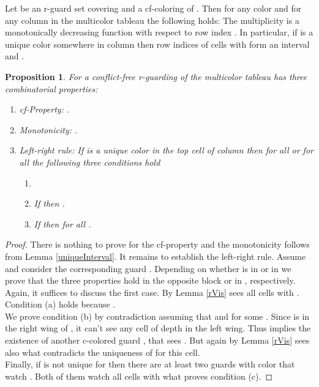 \documentclass[a4paper,USenglish,numberwithinsect]{lipics}
\theoremstyle{plain}
\newtheorem{proposition}[theorem]{Proposition}
\begin{document}
\begin{lemma}
\label{uniqueInterval}
Let  be an r-guard set covering  and  
a cf-coloring of . Then for any color  and for any column in
the multicolor tableau  the following holds: The
multiplicity 
is a monotonically decreasing function with respect to  row index .
In particular, if  is a unique color somewhere in column  then
row indices of cells
with  form an interval  and  .
\end{lemma}

\begin{proposition}
\label{r-visAdmiss}
For  a conflict-free r-guarding   of 
the multicolor
tableau 
has  three combinatorial properties:
\begin{enumerate}
\item cf-Property: .
\item Monotonicity: .
\item Left-right rule:   If  is a unique color in the top cell
 of column  then for
all  or for all  the following three
conditions hold
\begin{enumerate}
\item 
\item If  then  .
\item If  then  for all .
\end{enumerate}
\end{enumerate}
\end{proposition}
\begin{proof}
There is nothing to prove for the cf-property and the monotonicity
follows from
Lemma \ref{uniqueInterval}.
It remains to establish the left-right rule.
Assume   and consider  the corresponding
guard .
Depending on whether  is in  or in  we 
prove that the
three properties hold in the opposite block  or in , respectively. Again,
it suffices to
discuss the first case. By Lemma \ref{rVis}  sees all cells 
with .
Condition (a) holds because . \\
We prove  condition (b) by contradiction assuming  that 
and 
for some . Since  is in the right wing
of , it can't see any cell of depth  in the left wing. Thus
 implies the existence of another c-colored guard
, that sees
. But again by Lemma \ref{rVis}   sees also
 what contradicts
the uniqueness of  for this cell. \\
Finally, if  is not unique for   then there are at least two
guards with color  that watch
. Both of them watch all cells  with  what proves
condition (c). \end{proof}
\end{document}
